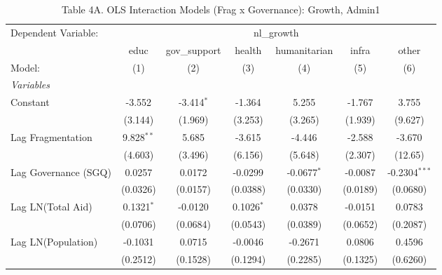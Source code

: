 \par\endgroup



\begin{table}[htbp]
   \caption{Table 4A. OLS Interaction Models (Frag x Governance): Growth, Admin1}
   \centering
   \begin{tabular}{lcccccc}
      \tabularnewline \midrule \midrule
      Dependent Variable: & \multicolumn{6}{c}{nl\_growth}\\
                                         & educ          & gov\_support  & health       & humanitarian  & infra    & other \\   
      Model:                             & (1)           & (2)           & (3)          & (4)           & (5)      & (6)\\  
      \midrule
      \emph{Variables}\\
      Constant                           & -3.552        & -3.414$^{*}$  & -1.364       & 5.255         & -1.767   & 3.755\\   
                                         & (3.144)       & (1.969)       & (3.253)      & (3.265)       & (1.939)  & (9.627)\\   
      Lag Fragmentation                  & 9.828$^{**}$  & 5.685         & -3.615       & -4.446        & -2.588   & -3.670\\   
                                         & (4.603)       & (3.496)       & (6.156)      & (5.648)       & (2.307)  & (12.65)\\   
      Lag Governance (SGQ)               & 0.0257        & 0.0172        & -0.0299      & -0.0677$^{*}$ & -0.0087  & -0.2304$^{***}$\\   
                                         & (0.0326)      & (0.0157)      & (0.0388)     & (0.0330)      & (0.0189) & (0.0680)\\   
      Lag LN(Total Aid)                  & 0.1321$^{*}$  & -0.0120       & 0.1026$^{*}$ & 0.0378        & -0.0151  & 0.0783\\   
                                         & (0.0706)      & (0.0684)      & (0.0543)     & (0.0389)      & (0.0652) & (0.2087)\\   
      Lag LN(Population)                 & -0.1031       & 0.0715        & -0.0046      & -0.2671       & 0.0806   & 0.4596\\   
                                         & (0.2512)      & (0.1528)      & (0.1294)     & (0.2285)      & (0.1325) & (0.6260)\\   

\end{tabular}
\end{table}
